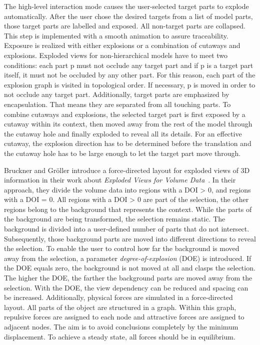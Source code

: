 The high-level interaction mode causes the user-selected target parts to explode automatically. After the user chose the desired targets from a list of model parts, those target parts are labelled and exposed. All non-target parts are collapsed. This step is implemented with a smooth animation to assure traceability. Exposure is realized with either explosions or a combination of cutaways and explosions. Exploded views for non-hierarchical models have to meet two conditions: each part p must not occlude any target part and if p is a target part itself, it must not be occluded by any other part. For this reason, each part of the explosion graph is visited in topological order. If necessary, p is moved in order to not occlude any target part. Additionally, target parts are emphasized by encapsulation. That means they are separated from all touching parts. To combine cutaways and explosions, the selected target part is first exposed by a cutaway within its context, then moved away from the rest of the model through the cutaway hole and finally exploded to reveal all its details. For an effective cutaway, the explosion direction has to be determined before the translation and the cutaway hole has to be large enough to let the target part move through.

Bruckner and Gr{\"o}ller introduce a force-directed layout for exploded views of 3D information in their work about \emph{Exploded Views for Volume Data}~\cite{jour:explodedView}. In their approach, they divide the volume data into regions with a DOI > 0, and regions with a DOI = 0. All regions with a DOI > 0 are part of the selection, the other regions belong to the background that represents the context. While the parts of the background are being transformed, the selection remains static. The background is divided into a user-defined number of parts that do not intersect. Subsequently, those background parts are moved into different directions to reveal the selection. To enable the user to control how far the background is moved away from the selection, a parameter \emph{degree-of-explosion} (DOE) is introduced. If the DOE equals zero, the background is not moved at all and clasps the selection. The higher the DOE, the farther the background parts are moved away from the selection. With the DOE, the view dependency can be reduced and spacing can be increased. Additionally, physical forces are simulated in a force-directed layout. All parts of the object are structured in a graph. Within this graph, repulsive forces are assigned to each node and attractive forces are assigned to adjacent nodes. The aim is to avoid conclusions completely by the minimum displacement. To achieve a steady state, all forces should be in equilibrium.

